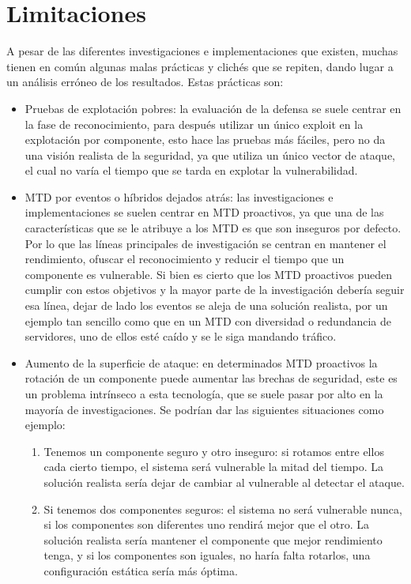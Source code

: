 \section{Limitaciones}
A pesar de las diferentes investigaciones e implementaciones que existen, muchas tienen en común algunas malas prácticas y clichés que se repiten, dando lugar a un análisis erróneo de los resultados. Estas prácticas son:
\begin{itemize}
    \item Pruebas de explotación pobres: la evaluación de la defensa se suele centrar en la fase de reconocimiento, para después utilizar un único exploit en la explotación por componente, esto hace las pruebas más fáciles, pero no da una visión realista de la seguridad, ya que utiliza un único vector de ataque, el cual no varía el tiempo que se tarda en explotar la vulnerabilidad.
    \item MTD por eventos o híbridos dejados atrás: las investigaciones e implementaciones se suelen centrar en MTD proactivos, ya que una de las características que se le atribuye a los MTD es que son inseguros por defecto. Por lo que las líneas principales de investigación se centran en mantener el rendimiento, ofuscar el reconocimiento y reducir el tiempo que un componente es vulnerable. Si bien es cierto que los MTD proactivos pueden cumplir con estos objetivos y la mayor parte de la investigación debería seguir esa línea, dejar de lado los eventos se aleja de una solución realista, por un ejemplo tan sencillo como que en un MTD con diversidad o redundancia de servidores, uno de ellos esté caído y se le siga mandando tráfico.
    \item Aumento de la superficie de ataque: en determinados MTD proactivos la rotación de un componente puede aumentar las brechas de seguridad\cite{MTD-critica}, este es un problema intrínseco a esta tecnología, que se suele pasar por alto en la mayoría de investigaciones. Se podrían dar las siguientes situaciones como ejemplo:
    \begin{enumerate}
        \item Tenemos un componente seguro y otro inseguro: si rotamos entre ellos cada cierto tiempo, el sistema será vulnerable la mitad del tiempo. La solución realista sería dejar de cambiar al vulnerable al detectar el ataque.
        \item Si tenemos dos componentes seguros: el sistema no será vulnerable nunca, si los componentes son diferentes uno rendirá mejor que el otro. La solución realista sería mantener el componente que mejor rendimiento tenga, y si los componentes son iguales, no haría falta rotarlos, una configuración estática sería más óptima.

\end{enumerate}
\end{itemize}
